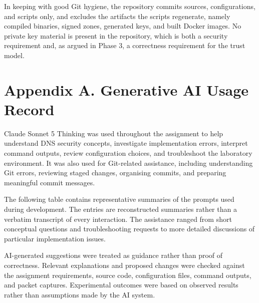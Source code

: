 \documentclass[11pt]{article}
\begin{document}
In keeping with good Git hygiene, the repository commits sources, configurations,
and scripts only, and excludes the artifacts the scripts regenerate, namely
compiled binaries, signed zones, generated keys, and built Docker images. No private
key material is present in the repository, which is both a security requirement and,
as argued in Phase 3, a correctness requirement for the trust model.

\section{Appendix A. Generative AI Usage Record}
\label{app:ai-usage}

Claude Sonnet 5 Thinking was used throughout the assignment to help
understand DNS security concepts, investigate implementation errors,
interpret command outputs, review configuration choices, and troubleshoot
the laboratory environment. It was also used for Git-related assistance,
including understanding Git errors, reviewing staged changes, organising
commits, and preparing meaningful commit messages.

The following table contains representative summaries of the prompts
used during development. The entries are reconstructed summaries rather
than a verbatim transcript of every interaction. The assistance ranged
from short conceptual questions and troubleshooting requests to more
detailed discussions of particular implementation issues.

AI-generated suggestions were treated as guidance rather than proof of
correctness. Relevant explanations and proposed changes were checked
against the assignment requirements, source code, configuration files,
command outputs, and packet captures. Experimental outcomes were based
on observed results rather than assumptions made by the AI system.
\end{document}
